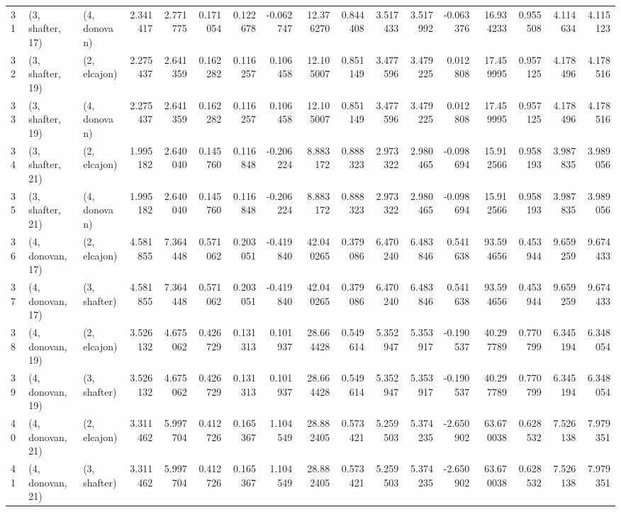\begin{tabular}{lllrrrrrrrrrrrrrr}
31 &  (3, shafter, 17) &     (4, donovan) &  2.341417 &  2.771775 &   0.171054 &  0.122678 & -0.062747 &  12.376270 &  0.844408 &   3.517433 &  3.517992 & -0.063376 &  16.934233 &  0.955508 &  4.114634 &  4.115123 \\
32 &  (3, shafter, 19) &     (2, elcajon) &  2.275437 &  2.641359 &   0.162282 &  0.116257 &  0.106458 &  12.105007 &  0.851149 &   3.477596 &  3.479225 &  0.012808 &  17.459995 &  0.957125 &  4.178496 &  4.178516 \\
33 &  (3, shafter, 19) &     (4, donovan) &  2.275437 &  2.641359 &   0.162282 &  0.116257 &  0.106458 &  12.105007 &  0.851149 &   3.477596 &  3.479225 &  0.012808 &  17.459995 &  0.957125 &  4.178496 &  4.178516 \\
34 &  (3, shafter, 21) &     (2, elcajon) &  1.995182 &  2.640040 &   0.145760 &  0.116848 & -0.206224 &   8.883172 &  0.888323 &   2.973322 &  2.980465 & -0.098694 &  15.912566 &  0.958193 &  3.987835 &  3.989056 \\
35 &  (3, shafter, 21) &     (4, donovan) &  1.995182 &  2.640040 &   0.145760 &  0.116848 & -0.206224 &   8.883172 &  0.888323 &   2.973322 &  2.980465 & -0.098694 &  15.912566 &  0.958193 &  3.987835 &  3.989056 \\
36 &  (4, donovan, 17) &     (2, elcajon) &  4.581855 &  7.364448 &   0.571062 &  0.203051 & -0.419840 &  42.040265 &  0.379086 &   6.470240 &  6.483846 &  0.541638 &  93.594656 &  0.453944 &  9.659259 &  9.674433 \\
37 &  (4, donovan, 17) &     (3, shafter) &  4.581855 &  7.364448 &   0.571062 &  0.203051 & -0.419840 &  42.040265 &  0.379086 &   6.470240 &  6.483846 &  0.541638 &  93.594656 &  0.453944 &  9.659259 &  9.674433 \\
38 &  (4, donovan, 19) &     (2, elcajon) &  3.526132 &  4.675062 &   0.426729 &  0.131313 &  0.101937 &  28.664428 &  0.549614 &   5.352947 &  5.353917 & -0.190537 &  40.297789 &  0.770799 &  6.345194 &  6.348054 \\
39 &  (4, donovan, 19) &     (3, shafter) &  3.526132 &  4.675062 &   0.426729 &  0.131313 &  0.101937 &  28.664428 &  0.549614 &   5.352947 &  5.353917 & -0.190537 &  40.297789 &  0.770799 &  6.345194 &  6.348054 \\
40 &  (4, donovan, 21) &     (2, elcajon) &  3.311462 &  5.997704 &   0.412726 &  0.165367 &  1.104549 &  28.882405 &  0.573421 &   5.259503 &  5.374235 & -2.650902 &  63.670038 &  0.628532 &  7.526138 &  7.979351 \\
41 &  (4, donovan, 21) &     (3, shafter) &  3.311462 &  5.997704 &   0.412726 &  0.165367 &  1.104549 &  28.882405 &  0.573421 &   5.259503 &  5.374235 & -2.650902 &  63.670038 &  0.628532 &  7.526138 &  7.979351 \\

\end{tabular}
